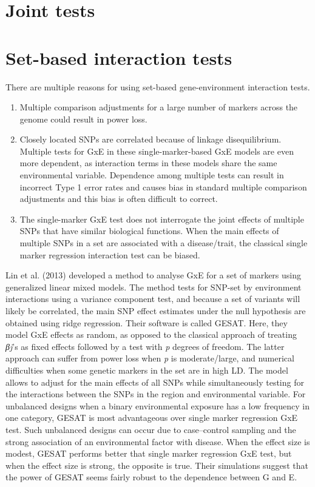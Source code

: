 \documentclass[]{book}
\providecommand{\tightlist}{%
  \setlength{\itemsep}{0pt}\setlength{\parskip}{0pt}}
\theoremstyle{definition}
\theoremstyle{definition}
\theoremstyle{definition}
\theoremstyle{remark}
\begin{document}
\section{Joint tests}\label{joint-tests}

\section{Set-based interaction tests}\label{set-based-interaction-tests}

There are multiple reasons for using set-based gene-environment
interaction tests.

\begin{enumerate}
\def\labelenumi{\arabic{enumi}.}
\tightlist
\item
  Multiple comparison adjustments for a large number of markers across
  the genome could result in power loss.
\item
  Closely located SNPs are correlated because of linkage disequilibrium.
  Multiple tests for GxE in these single-marker-based GxE models are
  even more dependent, as interaction terms in these models share the
  same environmental variable. Dependence among multiple tests can
  result in incorrect Type 1 error rates and causes bias in standard
  multiple comparison adjustments and this bias is often difficult to
  correct.
\item
  The single-marker GxE test does not interrogate the joint effects of
  multiple SNPs that have similar biological functions. When the main
  effects of multiple SNPs in a set are associated with a disease/trait,
  the classical single marker regression interaction test can be biased.
\end{enumerate}

Lin et al. (2013) developed a method to analyse GxE for a set of markers
using generalized linear mixed models. The method tests for SNP-set by
environment interactions using a variance component test, and because a
set of variants will likely be correlated, the main SNP effect estimates
under the null hypothesis are obtained using ridge regression. Their
software is called GESAT. Here, they model GxE effects as random, as
opposed to the classical approach of treating \emph{βj}'s as fixed
effects followed by a test with \emph{p} degrees of freedom. The latter
approach can suffer from power loss when \emph{p} is moderate/large, and
numerical difficulties when some genetic markers in the set are in high
LD. The model allows to adjust for the main effects of all SNPs while
simultaneously testing for the interactions between the SNPs in the
region and environmental variable. For unbalanced designs when a binary
environmental exposure has a low frequency in one category, GESAT is
most advantageous over single marker regression GxE test. Such
unbalanced designs can occur due to case--control sampling and the
strong association of an environmental factor with disease. When the
effect size is modest, GESAT performs better that single marker
regression GxE test, but when the effect size is strong, the opposite is
true. Their simulations suggest that the power of GESAT seems fairly
robust to the dependence between G and E.
\end{document}
